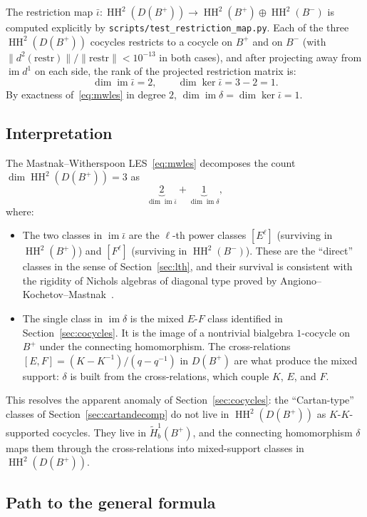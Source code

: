 \documentclass[11pt,letterpaper]{amsart}
\theoremstyle{plain}
\theoremstyle{definition}
\theoremstyle{remark}
\newcommand{\HH}{\operatorname{HH}}
\begin{document}
The restriction map $\bar\iota: \HH^2(D(B^+)) \to \HH^2(B^+) \oplus \HH^2(B^-)$ is computed explicitly by \texttt{scripts/test\_restriction\_map.py}. Each of the three $\HH^2(D(B^+))$ cocycles restricts to a cocycle on $B^+$ and on $B^-$ (with $\|d^2(\mathrm{restr})\| / \|\mathrm{restr}\| < 10^{-13}$ in both cases), and after projecting away from $\operatorname{im} d^1$ on each side, the rank of the projected restriction matrix is:
\[
\dim \operatorname{im} \bar\iota = 2, \qquad \dim \ker \bar\iota = 3 - 2 = 1.
\]
By exactness of~\eqref{eq:mwles} in degree $2$, $\dim \operatorname{im} \delta = \dim \ker \bar\iota = 1$.

\subsection{Interpretation}

The Mastnak--Witherspoon LES~\eqref{eq:mwles} decomposes the count $\dim \HH^2(D(B^+)) = 3$ as
\[
\underbrace{2}_{\dim \operatorname{im} \bar\iota} + \underbrace{1}_{\dim \operatorname{im} \delta},
\]
where:
\begin{itemize}
\item The two classes in $\operatorname{im} \bar\iota$ are the $\ell$-th power classes $[E^\ell]$ (surviving in $\HH^2(B^+)$) and $[F^\ell]$ (surviving in $\HH^2(B^-)$). These are the ``direct'' classes in the sense of Section~\ref{sec:lth}, and their survival is consistent with the rigidity of Nichols algebras of diagonal type proved by Angiono--Kochetov--Mastnak~\cite{AKM15}.
\item The single class in $\operatorname{im} \delta$ is the mixed $E$-$F$ class identified in Section~\ref{sec:cocycles}. It is the image of a nontrivial bialgebra $1$-cocycle on $B^+$ under the connecting homomorphism. The cross-relations $[E, F] = (K - K^{-1})/(q - q^{-1})$ in $D(B^+)$ are what produce the mixed support: $\delta$ is built from the cross-relations, which couple $K$, $E$, and $F$.
\end{itemize}

This resolves the apparent anomaly of Section~\ref{sec:cocycles}: the ``Cartan-type'' classes of Section~\ref{sec:cartandecomp} do not live in $\HH^2(D(B^+))$ as $K$-$K$-supported cocycles. They live in $\tilde{H}^1_b(B^+)$, and the connecting homomorphism $\delta$ maps them through the cross-relations into mixed-support classes in $\HH^2(D(B^+))$.

\subsection{Path to the general formula}
\end{document}
